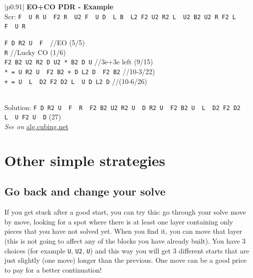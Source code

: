 \documentclass[11pt,a4paper]{book}
\newcommand{\p}{\textquotesingle}
\newcommand{\m}{\texttt}
\newcommand{\ps}{\p\,\,}
\newcommand{\comment}[1]{{\color{gray}\quad//#1}}
\begin{document}
\bigskip
\begin{tabular}{|p{}|}
\hline
\textbf{EO+CO PDR - Example}\\
\hline
Scr: \m{F\ps U R U\ps F2 R\ps U2 F\ps U D\ps L B\ps L2 F2 U2 R2 L\ps U2 B2 U2 R F2 L\ps F\ps U R}\\
\hline
\begin{minipage}[l]{0.650\textwidth}
\m{F D R2 U\ps F\ps}\comment{EO (5/5)}\\
\m{R\p} \comment{Lucky CO (1/6)}\\
\m{F2 B2 U2 R2 D U2 * B2 D U\p} \comment{3e+3e left (9/15)}\\
\m{* = U R2 U\ps F2 B2 + D L2 D\ps F2 B2} \comment{10-3/22)}\\
\m{+ = U\ps L\ps D2 F2 D2 L\ps U D L2 D\p} \comment{(10-6/26)}
\end{minipage}
\begin{minipage}[c]{0.25\textwidth}

\end{minipage}\\
\hline
Solution: \m{F D R2 U\ps F\ps R\ps F2 B2 U2 R2 U\ps D R2 U\ps F2 B2 U\ps L\ps D2 F2 D2 L\ps U F2 U\ps D} (27)\\
\hline
\emph{See on }\href{https://alg.cubing.net/?setup=F-_U_R_U-_F2_R-_U2_F-_U_D-_L_B-_L2_F2_U2_R2_L-_U2_B2_U2_R_F2_L-_F-_U_R_&alg=F_D_R2_U-_F-_\%2F\%2FEO_(5\%2F5)\%0AR-_\%2F\%2FLucky_CO_(1\%2F6)\%0AF2_B2_U2_R2_D_U2_B2_D_U-_\%2F\%2F3e_\%26\%232b\%3B_3e_left}{alg.cubing.net}\\
\hline
\end{tabular}
\bigskip


\section{Other simple strategies}
\subsection{Go back and change your solve}
\label{goback}
If you get stuck after a good start, you can try this: go through your solve move by move, looking for a spot where there is at least one layer containing only pieces that you have not solved yet. When you find it, you can move that layer (this is not going to affect any of the blocks you have already built). You have 3 choices (for example \m U, \m{U2}, \m{U\p}) and this way you will get 3 different starts that are just slightly (one move) longer than the previous. One move can be a good price to pay for a better continuation!
\end{document}
